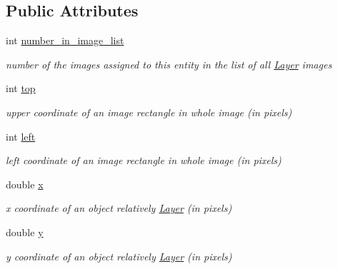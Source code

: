 \subsection*{Public Attributes}
\begin{DoxyCompactItemize}
\item 
\mbox{\label{class_object_a90c94b63236bf5be6946381db72641dc}} 
int \hyperlink{class_object_a90c94b63236bf5be6946381db72641dc}{number\+\_\+in\+\_\+image\+\_\+list}
\begin{DoxyCompactList}\small\item\em number of the images assigned to this entity in the list of all \hyperlink{class_layer}{Layer} images \end{DoxyCompactList}\item 
\mbox{\label{class_object_ad3d50969ef24f16edb7337b76a99bb4e}} 
int \hyperlink{class_object_ad3d50969ef24f16edb7337b76a99bb4e}{top}
\begin{DoxyCompactList}\small\item\em upper coordinate of an image rectangle in whole image (in pixels) \end{DoxyCompactList}\item 
\mbox{\label{class_object_a7fc665396287cedde719083c0ec6d28f}} 
int \hyperlink{class_object_a7fc665396287cedde719083c0ec6d28f}{left}
\begin{DoxyCompactList}\small\item\em left coordinate of an image rectangle in whole image (in pixels) \end{DoxyCompactList}\item 
\mbox{\label{class_object_a02010c1708632be33a760486b1f648f8}} 
double \hyperlink{class_object_a02010c1708632be33a760486b1f648f8}{x}
\begin{DoxyCompactList}\small\item\em x coordinate of an object relatively \hyperlink{class_layer}{Layer} (in pixels) \end{DoxyCompactList}\item 
\mbox{\label{class_object_a542c4d6094ace575fb4a28f46b9cc6a1}} 
double \hyperlink{class_object_a542c4d6094ace575fb4a28f46b9cc6a1}{y}
\begin{DoxyCompactList}\small\item\em y coordinate of an object relatively \hyperlink{class_layer}{Layer} (in pixels) \end{DoxyCompactList}\item 

\end{DoxyCompactItemize}
